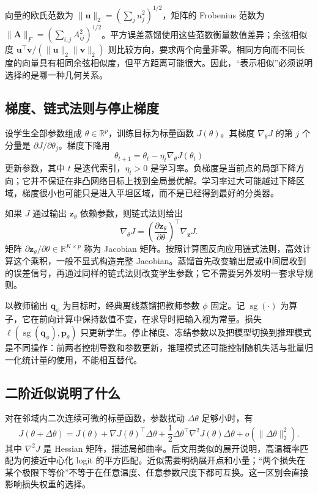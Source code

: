 \documentclass[UTF8,12pt,a4paper,fontset=fandol]{ctexart}
\begin{document}
向量的欧氏范数为 $\|\mathbf u\|_2=(\sum_j u_j^2)^{1/2}$，矩阵的 Frobenius 范数为 $\|\mathbf A\|_F=(\sum_{i,j}A_{ij}^2)^{1/2}$。平方误差蒸馏使用这些范数衡量数值差异；余弦相似度 $\mathbf u^\top\mathbf v/(\|\mathbf u\|_2\|\mathbf v\|_2)$ 则比较方向，要求两个向量非零。相同方向而不同长度的向量具有相同余弦相似度，但平方距离可能很大。因此，“表示相似”必须说明选择的是哪一种几何关系。

\subsection{梯度、链式法则与停止梯度}
设学生全部参数组成 $\theta\in\mathbb R^p$，训练目标为标量函数 $J(\theta)$。其梯度 $\nabla_\theta J$ 的第 $j$ 个分量是 $\partial J/\partial\theta_j$。梯度下降用
\begin{equation}
  \theta_{t+1}=\theta_t-\eta_t\nabla_\theta J(\theta_t)
  \label{eq:kd-gradient-descent}
\end{equation}
更新参数，其中 $t$ 是迭代索引，$\eta_t>0$ 是学习率。负梯度是当前点的局部下降方向；它并不保证在非凸网络目标上找到全局最优解。学习率过大可能越过下降区域，梯度很小也可能只是进入平坦区域，而不是已经得到最好的分类器。

如果 $J$ 通过输出 $\mathbf z_\theta$ 依赖参数，则链式法则给出
\begin{equation}
  \nabla_\theta J
  =\left(\frac{\partial\mathbf z_\theta}{\partial\theta}\right)^\top
    \nabla_{\mathbf z}J.
  \label{eq:kd-chain}
\end{equation}
矩阵 $\partial\mathbf z_\theta/\partial\theta\in\mathbb R^{K\times p}$ 称为 Jacobian 矩阵。按照计算图反向应用链式法则，高效计算这个乘积，一般不显式构造完整 Jacobian。蒸馏首先改变输出层或中间层收到的误差信号，再通过同样的链式法则改变学生参数；它不需要另外发明一套求导规则。

以教师输出 $\mathbf q_\phi$ 为目标时，经典离线蒸馏把教师参数 $\phi$ 固定。记 $\operatorname{sg}(\cdot)$ 为算子，它在前向计算中保持数值不变，在求导时把输入视为常量。损失 $\ell(\operatorname{sg}(\mathbf q_\phi),\mathbf p_\theta)$ 只更新学生。停止梯度、冻结参数以及把模型切换到推理模式是不同操作：前两者控制导数和参数更新，推理模式还可能控制随机失活与批量归一化统计量的使用，不能相互替代。

\subsection{二阶近似说明了什么}
对在邻域内二次连续可微的标量函数，参数扰动 $\Delta\theta$ 足够小时，有
\[
 J(\theta+\Delta\theta)=J(\theta)+\nabla J(\theta)^\top\Delta\theta
 +\frac12\Delta\theta^\top\nabla^2J(\theta)\Delta\theta
 +o(\|\Delta\theta\|_2^2).
\]
其中 $\nabla^2J$ 是 Hessian 矩阵，描述局部曲率。后文用类似的展开说明，高温概率匹配为何接近中心化 logit 的平方匹配。近似需要明确展开点和小量；“两个损失在某个极限下等价”不等于在任意温度、任意参数尺度下都可互换。这一区别会直接影响损失权重的选择。
\end{document}
